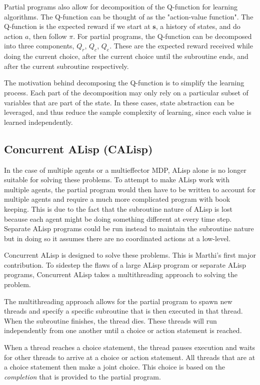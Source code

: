 \documentclass[jair,twoside,11pt,theapa]{article}
\begin{document}
Partial programs also allow for decomposition of the Q-function for learning algorithms. The Q-function can be thought of as the "action-value function". The Q-function is the expected reward if we start at $\textbf{s}$, a history of states, and do action $a$, then follow $\pi$. For partial programs, the Q-function can be decomposed into three components, $Q_r$, $Q_c$, $Q_e$. These are the expected reward received while doing the current choice, after the current choice until the subroutine ends, and after the current subroutine respectively.  

The motivation behind decomposing the Q-function is to simplify the learning process. Each part of the decomposition may only rely on a particular subset of variables that are part of the state. In these cases, state abstraction can be leveraged, and thus reduce the sample complexity of learning, since each value is learned independently. 


\subsection{Concurrent ALisp (CALisp)}
\label{CALisp}
In the case of multiple agents or a multieffector MDP, ALisp alone is no longer suitable for solving these problems. To attempt to make ALisp work with multiple agents, the partial program would then have to be written to account for multiple agents and require a much more complicated program with book keeping. This is due to the fact that the subroutine nature of ALisp is lost because each agent might be doing something different at every time step. Separate ALisp programs could be run instead to maintain the subroutine nature but in doing so it assumes there are no coordinated actions at a low-level. 

Concurrent ALisp is designed to solve these problems. This is Marthi's first major contribution. To sidestep the flaws of a large ALisp program or separate ALisp programs, Concurrent ALisp takes a multithreading approach to solving the problem.

The multithreading approach allows for the partial program to spawn new threads and specify a specific subroutine that is then executed in that thread. When the subroutine finishes, the thread dies. These threads will run independently from one another until a choice or action statement is reached. 

When a thread reaches a choice statement, the thread pauses execution and waits for other threads to arrive at a choice or action statement. All threads that are at a choice statement then make a joint choice. This choice is based on the \textit{completion} that is provided to the partial program. 
\end{document}
